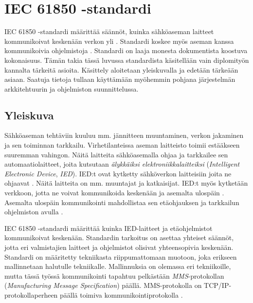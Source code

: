 \chapter{IEC 61850 -standardi}
\label{ch:iec61850-theory}
IEC 61850 -standardi määrittää säännöt, kuinka sähköaseman laitteet kommunikoivat keskenään verkon yli \cite[s.~1]{Kaneda2008}. Standardi koskee myös aseman kanssa kommunikoivia ohjelmistoja \cite[s.~10]{IEC61850-7-1}. Standardi on laaja monesta dokumentista koostuva kokonaisuus. Tämän takia tässä luvussa standardista käsitellään vain diplomityön kannalta tärkeitä asioita. Käsittely aloitetaan yleiskuvalla ja edetään tärkeään asiaan. Saatuja tietoja tullaan käyttämään myöhemmin pohjana järjestelmän arkkitehtuurin ja ohjelmiston suunnittelussa.


\section{Yleiskuva}
Sähköaseman tehtäviin kuuluu mm. jännitteen muuntaminen, verkon jakaminen ja sen toiminnan tarkkailu. Virhetilanteissa aseman laitteisto toimii estääkseen suuremman vahingon. Näitä laitteita sähköasemalla ohjaa ja tarkkailee sen automaatiolaitteet, joita kutsutaan \emph{älykkäiksi elektroniikkalaitteiksi} (\emph{Intelligent Electronic Device}, \emph{IED}). IED:t ovat kytketty sähköverkon laitteisiin joita ne ohjaavat \cite[s.~63--64]{IEC61850-7-1}. Näitä laitteita on mm. muuntajat ja katkaisijat. IED:t myös kytketään verkkoon, jotta ne voivat kommunikoida keskenään ja asemalta ulospäin \cite[s.~31]{IEC61850-7-1}. Asemalta ulospäin kommunikointi mahdollistaa sen etäohjauksen ja tarkkailun ohjelmiston avulla \cite[s.~1]{Brunner2008}.

IEC 61850 -standardi määrittää kuinka IED-laitteet ja etäohjelmistot kommunikoivat keskenään. Standardin tarkoitus on asettaa yhteiset säännöt, jotta eri valmistajien laitteet ja ohjelmistot olisivat yhteensopivia keskenään. Standardi on määritetty tekniikasta riippumattomaan muotoon, joka erikseen mallinnetaan halutulle tekniikalle. Mallinnuksia on olemassa eri tekniikoille, mutta tässä työssä kommunikointi tapahtuu pelkästään \emph{MMS}-protokollan (\emph{Manufacturing Message Specification}) päällä. MMS-protokolla on TCP/IP-protokollaperheen päällä toimiva kommunikointiprotokolla \cite{MMS-protocol-stack-and-API}.

